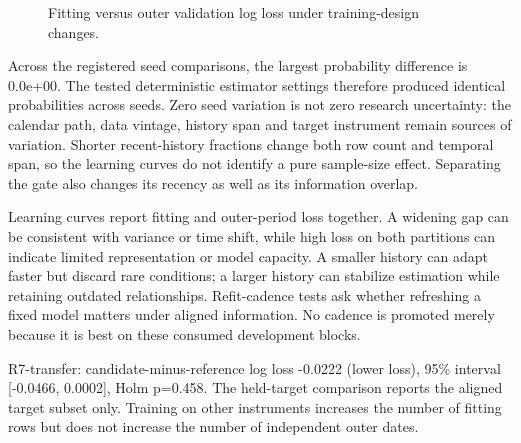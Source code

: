 \documentclass[11pt,a4paper]{article}
\begin{document}
\begin{figure}[htbp]\centering


\caption{Fitting versus outer validation log loss under training-design changes.}\label{fig:8}
\end{figure}

Across the registered seed comparisons, the largest probability difference is 0.0e+00. The tested deterministic estimator settings therefore produced identical probabilities across seeds. Zero seed variation is not zero research uncertainty: the calendar path, data vintage, history span and target instrument remain sources of variation. Shorter recent-history fractions change both row count and temporal span, so the learning curves do not identify a pure sample-size effect. Separating the gate also changes its recency as well as its information overlap.

Learning curves report fitting and outer-period loss together. A widening gap can be consistent with variance or time shift, while high loss on both partitions can indicate limited representation or model capacity. A smaller history can adapt faster but discard rare conditions; a larger history can stabilize estimation while retaining outdated relationships. Refit-cadence tests ask whether refreshing a fixed model matters under aligned information. No cadence is promoted merely because it is best on these consumed development blocks.

R7-transfer: candidate-minus-reference log loss -0.0222 (lower loss), 95\% interval [-0.0466, 0.0002], Holm p=0.458. The held-target comparison reports the aligned target subset only. Training on other instruments increases the number of fitting rows but does not increase the number of independent outer dates.
\end{document}
